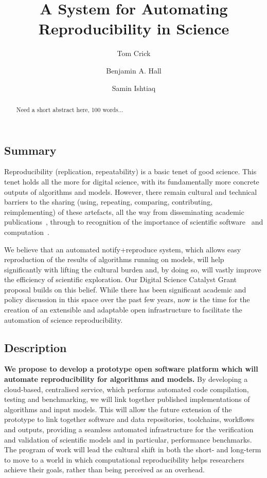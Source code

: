 \documentclass[a4paper,11pt]{article}
\title{\vspace{-4em}A System for Automating Reproducibility in Science}
\author[1]{Tom Crick}
\author[2]{Benjamin A. Hall}
\author[3]{Samin Ishtiaq}
\affil[1]{Department of Computing \& Information Systems, Cardiff Metropolitan University}
\affil[2]{MRC Cancer Unit, University of Cambridge}
\affil[3]{Microsoft Research Cambridge}
\affil[1]{\protect\url{tcrick@cardiffmet.ac.uk}}
\date{ }
\begin{document}
\maketitle

\begin{abstract}
Need a short abstract here, 100 words...
\end{abstract}


\subsection*{Summary}

Reproducibility (replication, repeatability) is a basic tenet of good
science. This tenet holds all the more for digital science, with its
fundamentally more concrete outputs of algorithms and models. However,
there remain cultural and technical barriers to the sharing (using,
repeating, comparing, contributing, reimplementing) of these
artefacts, all the way from disseminating academic
publications~\cite{deroure:2010,stodden-et-al:2013,fursin+dubach:2014},
through to recognition of the importance of scientific
software~\cite{goble:2014} and computation~\cite{gent:2013}.

We believe that an automated notify+reproduce system, which allows
easy reproduction of the results of algorithms running on models, will
help significantly with lifting the cultural burden and, by doing so,
will vastly improve the efficiency of scientific exploration. Our
Digital Science Catalyst Grant proposal builds on this belief. While
there has been significant academic and policy discussion in this
space over the past few years, now is the time for the creation of an
extensible and adaptable open infrastructure to facilitate the
automation of science reproducibility.


\subsection*{Description}
{\textbf{We propose to develop a prototype open software platform
which will automate reproducibility for algorithms and models.}}  By
developing a cloud-based, centralised service, which performs
automated code compilation, testing and benchmarking, we will link
together published implementations of algorithms and input
models. This will allow the future extension of the prototype to link
together software and data repositories, toolchains, workflows and
outputs, providing a seamless automated infrastructure for the
verification and validation of scientific models and in particular,
performance benchmarks. The program of work will lead the cultural
shift in both the short- and long-term to move to a world in which
computational reproducibility helps researchers achieve their goals,
rather than being perceived as an overhead.
\end{document}
